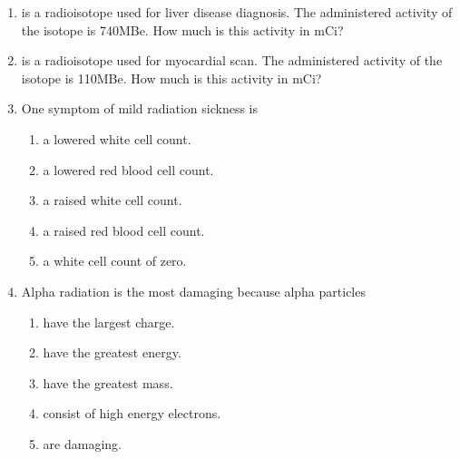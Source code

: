 \documentclass[main.tex]{subfiles}
\begin{document}
\begin{multicols*}{2}
\begin{enumerate}
\item  {} is a radioisotope used for liver disease diagnosis. The administered  activity of the isotope is 740MBe. How much is this activity in mCi?
\begin{enumerate}[label=(\alph*)]
\end{enumerate}


\item  {} is a radioisotope used for myocardial scan. The administered  activity of the isotope is 110MBe. How much is this activity in mCi?
\begin{enumerate}[label=(\alph*)]
\end{enumerate}

\item One symptom of mild radiation sickness is	
\begin{enumerate}[label=(\alph*)]
\item a lowered white cell count.
\item a lowered red blood cell count.
\item a raised white cell count.
\item a raised red blood cell count.
\item a white cell count of zero.
\end{enumerate}

\item Alpha radiation is the most damaging because alpha particles	
\begin{enumerate}[label=(\alph*)]
\item have the largest charge.
\item have the greatest energy.
\item have the greatest mass.
\item consist of high energy electrons.
\item are damaging.
\end{enumerate}


\end{enumerate}
\end{multicols*}
\end{document}
